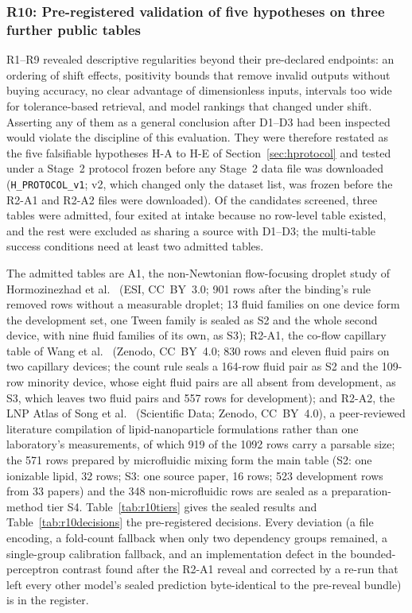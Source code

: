 \documentclass[11pt,a4paper]{article}
\begin{document}
\subsubsection{R10: Pre-registered validation of five hypotheses on three further public tables}
\label{sec:r10}

R1--R9 revealed descriptive regularities beyond their pre-declared
endpoints: an ordering of shift effects, positivity bounds that remove invalid
outputs without buying accuracy, no clear advantage of dimensionless inputs,
intervals too wide for tolerance-based retrieval, and model rankings that
changed under shift. Asserting any of them as a general conclusion after
D1--D3 had been inspected would violate the discipline of this evaluation. They
were therefore restated as the five falsifiable hypotheses H-A to H-E of
Section~\ref{sec:hprotocol} and tested under a Stage~2 protocol frozen before
any Stage~2 data file was downloaded (\texttt{H\_PROTOCOL\_v1}; v2, which changed
only the dataset list, was frozen before the R2-A1 and R2-A2 files were
downloaded). Of the candidates screened, three tables were admitted,
four exited at intake because no row-level table existed, and the rest were
excluded as sharing a source with D1--D3; the multi-table success conditions
need at least two admitted tables.

The admitted tables are A1, the non-Newtonian flow-focusing droplet study of
Hormozinezhad et al.~\cite{labchip2025dimless} (ESI, CC~BY~3.0; 901 rows after
the binding's rule removed rows without a measurable droplet; 13 fluid
families on one device form the development set, one Tween family is sealed
as S2 and the whole second device, with nine fluid families of its own, as
S3); R2-A1, the co-flow capillary table of Wang et al.~\cite{wang2024coflow}
(Zenodo, CC~BY~4.0; 830 rows and eleven fluid pairs on two capillary devices;
the count rule seals a 164-row fluid pair as S2 and the 109-row minority
device, whose eight fluid pairs are all absent from development, as S3, which
leaves two fluid pairs and 557 rows for development); and R2-A2, the LNP
Atlas of Song et al.~\cite{lnpatlas2025} (Scientific Data; Zenodo,
CC~BY~4.0), a peer-reviewed literature compilation of lipid-nanoparticle
formulations rather than one laboratory's measurements, of which 919 of the
1092 rows carry a parsable size; the 571 rows prepared by microfluidic
mixing form the main table (S2: one ionizable lipid, 32 rows; S3: one source
paper, 16 rows; 523 development rows from 33 papers) and the 348
non-microfluidic rows are sealed as a preparation-method tier S4.
Table~\ref{tab:r10tiers} gives the sealed results and
Table~\ref{tab:r10decisions} the pre-registered decisions. Every deviation
(a file encoding, a fold-count fallback when only two dependency groups
remained, a single-group calibration fallback, and an implementation defect
in the bounded-perceptron contrast found after the R2-A1 reveal and corrected
by a re-run that left every other model's sealed prediction byte-identical to
the pre-reveal bundle) is in the register.
\end{document}
